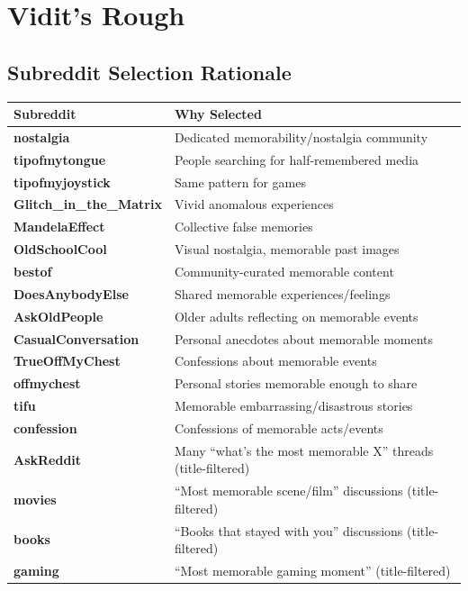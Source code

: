 \section{Vidit's Rough}

\subsection{Subreddit Selection Rationale}

\begin{table}[h]
\centering
\small
\begin{tabular}{|l|l|}
\hline
\textbf{Subreddit} & \textbf{Why Selected} \\
\hline
\textbf{nostalgia} & Dedicated memorability/nostalgia community \\
\textbf{tipofmytongue} & People searching for half-remembered media \\
\textbf{tipofmyjoystick} & Same pattern for games \\
\textbf{Glitch\_in\_the\_Matrix} & Vivid anomalous experiences \\
\textbf{MandelaEffect} & Collective false memories \\
\textbf{OldSchoolCool} & Visual nostalgia, memorable past images \\
\textbf{bestof} & Community-curated memorable content \\
\textbf{DoesAnybodyElse} & Shared memorable experiences/feelings \\
\textbf{AskOldPeople} & Older adults reflecting on memorable events \\
\textbf{CasualConversation} & Personal anecdotes about memorable moments \\
\textbf{TrueOffMyChest} & Confessions about memorable events \\
\textbf{offmychest} & Personal stories memorable enough to share \\
\textbf{tifu} & Memorable embarrassing/disastrous stories \\
\textbf{confession} & Confessions of memorable acts/events \\
\textbf{AskReddit} & Many ``what's the most memorable X'' threads (title-filtered) \\
\textbf{movies} & ``Most memorable scene/film'' discussions (title-filtered) \\
\textbf{books} & ``Books that stayed with you'' discussions (title-filtered) \\
\textbf{gaming} & ``Most memorable gaming moment'' (title-filtered) \\

\end{tabular}
\end{table}
